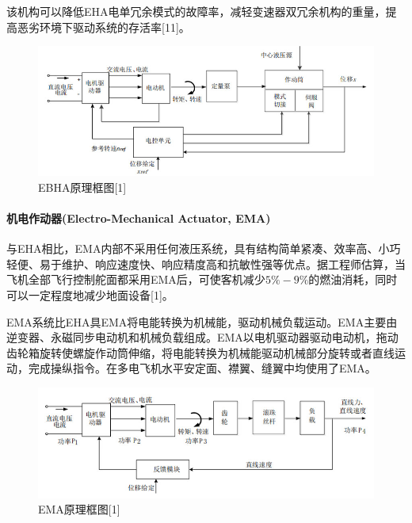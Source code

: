 \documentclass[12pt,a4paper]{report}
\begin{document}
该机构可以降低EHA电单冗余模式的故障率，减轻变速器双冗余机构的重量，提高恶劣环境下驱动系统的存活率[11]。

\begin{figure}[htp]
\centering
   \includegraphics[width=.8\textwidth]{ebhaprinciple.jpg}
    \caption{EBHA原理框图[1]}
    \label{fig:ebha}
\end{figure}

\paragraph{机电作动器(Electro-Mechanical Actuator, EMA)}
与EHA相比，EMA内部不采用任何液压系统，具有结构简单紧凑、效率高、小巧轻便、易于维护、响应速度快、响应精度高和抗敏性强等优点。据工程师估算，当飞机全部飞行控制舵面都采用EMA后，可使客机减少$5\%-9\%$的燃油消耗，同时可以一定程度地减少地面设备[1]。

EMA系统比EHA具EMA将电能转换为机械能，驱动机械负载运动。EMA主要由逆变器、永磁同步电动机和机械负载组成。EMA以电机驱动器驱动电动机，拖动齿轮箱旋转使螺旋作动筒伸缩，将电能转换为机械能驱动机械部分旋转或者直线运动，完成操纵指令。在多电飞机水平安定面、襟翼、缝翼中均使用了EMA。

\begin{figure}[htp]
\centering
   \includegraphics[width=.8\textwidth]{emaprinciple.jpg}
    \caption{EMA原理框图[1]}
    \label{fig:ema}
\end{figure}
\end{document}
